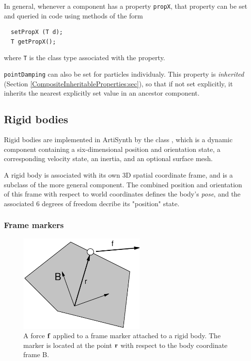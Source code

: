 \begin{sideblock}
In general, whenever a component has a property {\tt propX}, that
property can be set and queried in code using methods of the form
\begin{verbatim}
  setPropX (T d);
  T getPropX();
\end{verbatim}
where {\tt T} is the class type associated with the property.
\end{sideblock}

{\tt pointDamping} can also be set for particles individualy.  This
property is {\it inherited} (Section
\ref{CompositeInheritableProperties:sec}), so that if not set
explicitly, it inherits the nearest explicitly set value in an
ancestor component.

\subsection{Rigid bodies}

Rigid bodies are implemented in ArtiSynth by the class
, which is a dynamic
component containing a six-dimensional position and orientation state,
a corresponding velocity state, an inertia, and an optional surface
mesh.

A rigid body is associated with its own 3D spatial coordinate frame,
and is a subclass of the more general
 component.
The combined position and orientation of this frame with respect to
world coordinates defines the body's {\it pose}, and the associated 6
degrees of freedom decribe its "position" state.

\subsubsection{Frame markers}
\label{FrameMarkers:sec}

\begin{figure}[t]
\begin{center}
 \includegraphics[width=2.5in]{images/frameMarker}
\end{center}
\caption{A force ${\bf f}$ applied to a frame marker attached to a rigid
body. The marker is located at the point ${\bf r}$ with respect to the body
coordinate frame B.}
\label{frameMarker:fig}
\end{figure}

